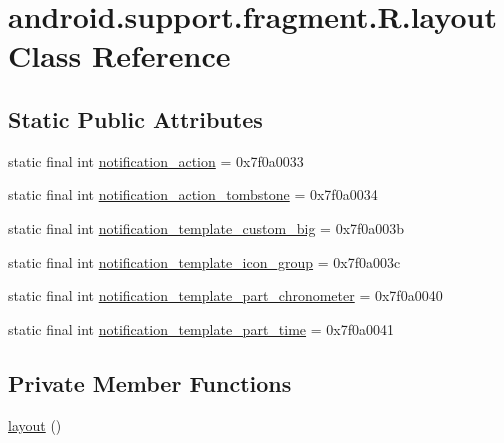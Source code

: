 \hypertarget{classandroid_1_1support_1_1fragment_1_1_r_1_1layout}{}\section{android.\+support.\+fragment.\+R.\+layout Class Reference}
\label{classandroid_1_1support_1_1fragment_1_1_r_1_1layout}
\subsection*{Static Public Attributes}
\begin{DoxyCompactItemize}
\item 
static final int \mbox{\hyperlink{classandroid_1_1support_1_1fragment_1_1_r_1_1layout_a791e08fcdc9e05bf963845223d181b0c}{notification\+\_\+action}} = 0x7f0a0033
\item 
static final int \mbox{\hyperlink{classandroid_1_1support_1_1fragment_1_1_r_1_1layout_a7d7b44c89af4927392573ce34e0ea1c9}{notification\+\_\+action\+\_\+tombstone}} = 0x7f0a0034
\item 
static final int \mbox{\hyperlink{classandroid_1_1support_1_1fragment_1_1_r_1_1layout_a13f474722b247fdd643e2d8604afd5aa}{notification\+\_\+template\+\_\+custom\+\_\+big}} = 0x7f0a003b
\item 
static final int \mbox{\hyperlink{classandroid_1_1support_1_1fragment_1_1_r_1_1layout_ae5a01afc8b1457fcb8e7ca7cb5b12ad6}{notification\+\_\+template\+\_\+icon\+\_\+group}} = 0x7f0a003c
\item 
static final int \mbox{\hyperlink{classandroid_1_1support_1_1fragment_1_1_r_1_1layout_a9d448ba0d8e460da8ea06572ca6f0816}{notification\+\_\+template\+\_\+part\+\_\+chronometer}} = 0x7f0a0040
\item 
static final int \mbox{\hyperlink{classandroid_1_1support_1_1fragment_1_1_r_1_1layout_ad29861bef0147e4d35f5e9b0575e5ed5}{notification\+\_\+template\+\_\+part\+\_\+time}} = 0x7f0a0041
\end{DoxyCompactItemize}
\subsection*{Private Member Functions}
\begin{DoxyCompactItemize}
\item 
\mbox{\hyperlink{classandroid_1_1support_1_1fragment_1_1_r_1_1layout_a35a1f390f9606563a5a61424f9bfc36d}{layout}} ()
\end{DoxyCompactItemize}


